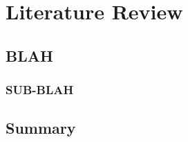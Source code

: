 \chapter{Literature Review}
\label{chap:chap2}

\textit{\fontsize{14pt}{\baselineskip}\selectfont{
		\lipsum[1]
}}
\newpage

\section{BLAH}
\lipsum[1]

\subsection{SUB-BLAH}
\lipsum[2]

\section{Summary}
\lipsum[3]

\forcedoublepage